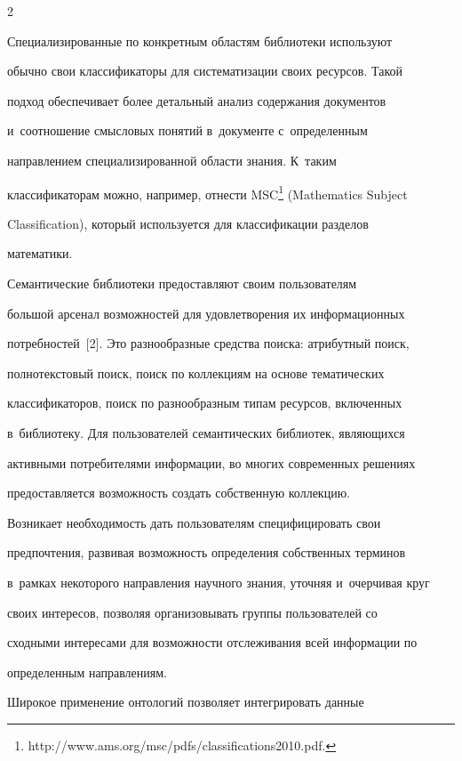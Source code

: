 \begin{multicols}{2}
     

     Специализированные по конкретным областям библиотеки используют 

обычно свои классификаторы для систематизации своих ресурсов. Такой 

подход обеспечивает более детальный анализ содержания документов 

и~соотношение смысловых понятий в~документе с~определенным 

направлением специализированной области знания. К~таким 

классификаторам можно, например, отнести MSC\footnote[4]{{\sf 

http://www.ams.org/msc/pdfs/classifications2010.pdf.}} (Mathematics Subject 

Classification), который используется для классификации разделов 

математики. 

     

     Семантические библиотеки предоставляют своим пользователям 

большой арсенал возможностей для удовлетворения их информационных 

потребностей~[2]. Это разнообразные средства поиска: атрибутный поиск, 

полнотекстовый поиск, поиск по коллекциям на основе тематических 

классификаторов, поиск по разнообразным типам ресурсов, включенных 

в~библиотеку. Для пользователей семантических библиотек, являющихся 

активными потребителями информации, во многих современных решениях 

предоставляется возможность создать собственную коллекцию. 

     

     Возникает необходимость дать пользователям специфицировать свои 

предпочтения, развивая возможность определения собственных терминов 

в~рамках некоторого направления научного знания, уточняя и~очерчивая круг 

своих интересов, позволяя организовывать группы пользователей со 

сходными интересами для возможности отслеживания всей информации по 

определенным направлениям.

     

     Широкое применение онтологий позволяет интегри\-ровать данные 


\end{multicols}
